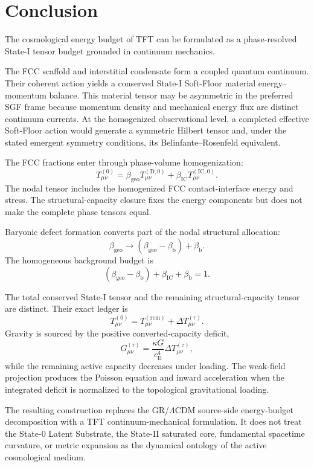 \section{Conclusion}

The cosmological energy budget of TFT can be formulated as a phase-resolved State-I tensor budget grounded in continuum mechanics.

The FCC scaffold and interstitial condensate form a coupled quantum continuum. Their coherent action yields a conserved State-I Soft-Floor material energy--momentum balance. This material tensor may be asymmetric in the preferred SGF frame because momentum density and mechanical energy flux are distinct continuum currents. At the homogenized observational level, a completed effective Soft-Floor action would generate a symmetric Hilbert tensor and, under the stated emergent symmetry conditions, its Belinfante--Rosenfeld equivalent.

The FCC fractions enter through phase-volume homogenization:
\begin{equation}
    T_{\mu\nu}^{(0)} = \beta_{\mathrm{geo}} T_{\mu\nu}^{(\mathrm{D},0)} + \beta_{\mathrm{IC}} T_{\mu\nu}^{(\mathrm{IC},0)}.
\end{equation}
The nodal tensor includes the homogenized FCC contact-interface energy and stress. The structural-capacity closure fixes the energy components but does not make the complete phase tensors equal.

Baryonic defect formation converts part of the nodal structural allocation:
\begin{equation}
    \beta_{\mathrm{geo}} \longrightarrow \left( \beta_{\mathrm{geo}} - \beta_{\mathrm{b}} \right) +\beta_{\mathrm{b}}.
\end{equation}
The homogeneous background budget is
\begin{equation}
    \left( \beta_{\mathrm{geo}} - \beta_{\mathrm{b}} \right) + \beta_{\mathrm{IC}} + \beta_{\mathrm{b}} = 1.
\end{equation}

The total conserved State-I tensor and the remaining structural-capacity tensor are distinct. Their exact ledger is
\begin{equation}
    T_{\mu\nu}^{(0)} = T_{\mu\nu}^{(\mathrm{rem})} + \Delta T_{\mu\nu}^{(\tau)}.
\end{equation}
Gravity is sourced by the positive converted-capacity deficit,
\begin{equation}
    G_{\mu\nu}^{(\tau)} = \frac{\kappa G}{c_{\mathrm{E}}^4} \Delta T_{\mu\nu}^{(\tau)},
\end{equation}
while the remaining active capacity decreases under loading. The weak-field projection produces the Poisson equation and inward acceleration when the integrated deficit is normalized to the topological gravitational loading.

The resulting construction replaces the GR/$\Lambda$CDM source-side energy-budget decomposition with a TFT continuum-mechanical formulation. It does not treat the State-0 Latent Substrate, the State-II saturated core, fundamental spacetime curvature, or metric expansion as the dynamical ontology of the active cosmological medium.
